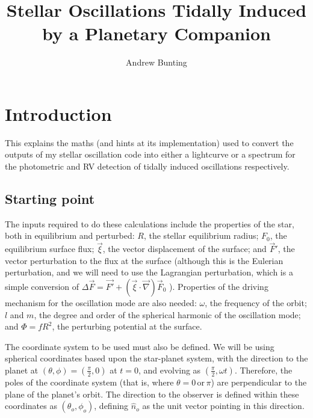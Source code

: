 \documentclass[11pt]{amsart}
\title{Stellar Oscillations Tidally Induced by a Planetary Companion}
\author{Andrew Bunting}
\begin{document}
\maketitle



\section{Introduction} \label{Introduction}

This explains the maths (and hints at its implementation) used to convert the outputs of my stellar oscillation code into either a lightcurve or a spectrum for the photometric and RV detection of tidally induced oscillations respectively.



\subsection{Starting point} \label{Intro:StartingPoint}

The inputs required to do these calculations include the properties of the star, both in equilibrium and perturbed: $R$, the stellar equilibrium radius; $F_{0}$, the equilibrium surface flux; $\vec{\xi}$, the vector displacement of the surface; and $\vec{F}'$, the vector perturbation to the flux at the surface (although this is the Eulerian perturbation, and we will need to use the Lagrangian perturbation, which is a simple conversion of $\Delta \vec{F} = \vec{F'} + ( \vec{\xi} \cdot \vec{\nabla} ) \vec{F}_{0}$ ).  Properties of the driving mechanism for the oscillation mode are also needed: $\omega$, the frequency of the orbit; $l$ and $m$, the degree and order of the spherical harmonic of the oscillation mode; and $\Phi =  f R^{2}$, the perturbing potential at the surface.

The coordinate system to be used must also be defined.  We will be using spherical coordinates based upon the star-planet system, with the direction to the planet at $(\theta, \phi) = (\frac{\pi}{2}, 0)$ at $t = 0$, and evolving as $(\frac{\pi}{2}, \omega t)$.  Therefore, the poles of the coordinate system (that is, where $\theta = 0 \, \text{or} \, \pi$) are perpendicular to the plane of the planet's orbit.  The direction to the observer is defined within these coordinates as $(\theta_{o}, \phi_{o})$, defining $\hat{n}_{o}$ as the unit vector pointing in this direction.
\end{document}
